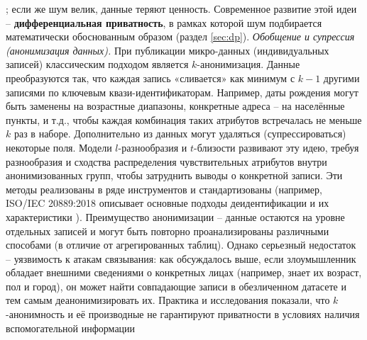\autocite{differentialprivacy-org}
; если же шум велик, данные теряют ценность. Современное развитие этой идеи – \textbf{дифференциальная приватность}, в рамках которой шум подбирается математически обоснованным образом (раздел \ref{sec:dp}). \textit{Обобщение и супрессия (анонимизация данных).} При публикации микро-данных (индивидуальных записей) классическим подходом является $k$-анонимизация. Данные преобразуются так, что каждая запись «сливается» как минимум с $k-1$ другими записями по ключевым квази-идентификаторам. Например, даты рождения могут быть заменены на возрастные диапазоны, конкретные адреса – на населённые пункты, и т.д., чтобы каждая комбинация таких атрибутов встречалась не меньше $k$ раз в наборе. Дополнительно из данных могут удаляться (супрессироваться) некоторые поля. Модели $l$-разнообразия и $t$-близости развивают эту идею, требуя разнообразия и сходства распределения чувствительных атрибутов внутри анонимизованных групп, чтобы затруднить выводы о конкретной записи. Эти методы реализованы в ряде инструментов и стандартизованы (например, ISO/IEC 20889:2018 описывает основные подходы деидентификации и их характеристики
\autocite{iapp-org}
). Преимущество анонимизации – данные остаются на уровне отдельных записей и могут быть повторно проанализированы различными способами (в отличие от агрегированных таблиц). Однако серьезный недостаток – уязвимость к атакам связывания: как обсуждалось выше, если злоумышленник обладает внешними сведениями о конкретных лицах (например, знает их возраст, пол и город), он может найти совпадающие записи в обезличенном датасете и тем самым деанонимизировать их. Практика и исследования показали, что $k$-анонимность и её производные не гарантируют приватности в условиях наличия вспомогательной информации

